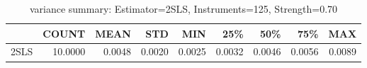 \begin{table}[ht]
\centering
\caption{variance summary: Estimator=2SLS, Instruments=125, Strength=0.70}
\begin{tabular}{lrrrrrrrr}
\toprule
 & COUNT & MEAN & STD & MIN & 25\% & 50\% & 75\% & MAX \\
\midrule
2SLS & 10.0000 & 0.0048 & 0.0020 & 0.0025 & 0.0032 & 0.0046 & 0.0056 & 0.0089 \\
\bottomrule
\end{tabular}
\end{table}

